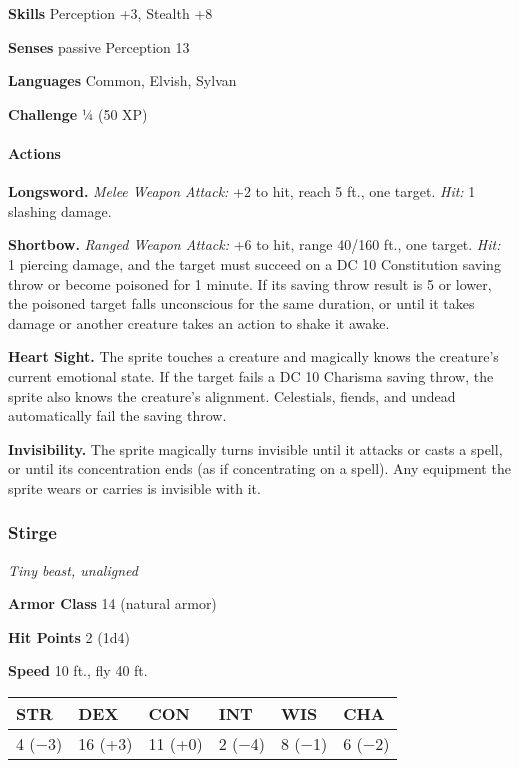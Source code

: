 \documentclass[
]{article}
\begin{document}
\textbf{Skills} Perception +3, Stealth +8

\textbf{Senses} passive Perception 13

\textbf{Languages} Common, Elvish, Sylvan

\textbf{Challenge} ¼ (50 XP)

\hypertarget{actions-12}{%
\paragraph{Actions}\label{actions-12}}

\textbf{Longsword.} \emph{Melee Weapon Attack:} +2 to hit, reach 5 ft.,
one target. \emph{Hit:} 1 slashing damage.

\textbf{Shortbow.} \emph{Ranged Weapon Attack:} +6 to hit, range 40/160
ft., one target. \emph{Hit:} 1 piercing damage, and the target must
succeed on a DC 10 Constitution saving throw or become poisoned for 1
minute. If its saving throw result is 5 or lower, the poisoned target
falls unconscious for the same duration, or until it takes damage or
another creature takes an action to shake it awake.

\textbf{Heart Sight.} The sprite touches a creature and magically knows
the creature's current emotional state. If the target fails a DC 10
Charisma saving throw, the sprite also knows the creature's alignment.
Celestials, fiends, and undead automatically fail the saving throw.

\textbf{Invisibility.} The sprite magically turns invisible until it
attacks or casts a spell, or until its concentration ends (as if
concentrating on a spell). Any equipment the sprite wears or carries is
invisible with it.

\hypertarget{stirge}{%
\subsubsection{Stirge}\label{stirge}}

\emph{Tiny beast, unaligned}

\textbf{Armor Class} 14 (natural armor)

\textbf{Hit Points} 2 (1d4)

\textbf{Speed} 10 ft., fly 40 ft.

\begin{longtable}[]{@{}llllll@{}}
\toprule
STR & DEX & CON & INT & WIS & CHA\tabularnewline
\midrule
\endhead
4 (−3) & 16 (+3) & 11 (+0) & 2 (−4) & 8 (−1) & 6 (−2)\tabularnewline
\bottomrule
\end{longtable}
\end{document}
